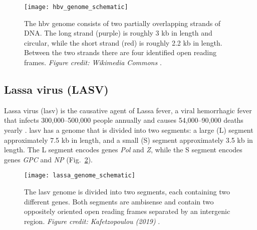 \begin{figure}[ht]
  \centering
  \medskip
  \texttt{[image: hbv\_genome\_schematic]}
  \caption[Schematic of the HBV genome]{The \gls{hbv} genome consists of two partially overlapping strands of DNA. The long strand (purple) is roughly 3 kb in length and circular, while the short strand (red) is roughly 2.2 kb in length. Between the two strands there are four identified open reading frames. \textit{Figure credit: Wikimedia Commons} \cite{HBVwiki}.}
  \label{fig:hbvGenome}
\end{figure}

\subsection{Lassa virus (LASV)}

Lassa virus (\gls{lasv}) is the causative agent of Lassa fever, a viral hemorrhagic fever that infects 300,000--500,000 people annually and causes 54,000--90,000 deaths yearly \cite{lianaThesis, asogun2012molecular}.
\gls{lasv} has a genome that is divided into two segments: a large (L) segment approximately 7.5 kb in length, and a small (S) segment approximately 3.5 kb in length.
The L segment encodes genes \textit{Pol} and \textit{Z}, while the S segment encodes genes \textit{GPC} and \textit{NP} (Fig.~\ref{fig:lasvGenome}).

\begin{figure}[ht]
  \centering
  \medskip
  \texttt{[image: lassa\_genome\_schematic]}
  \caption[Schematic of the LASV genome]{The \gls{lasv} genome is divided into two segments, each containing two different genes. Both segments are ambisense and contain two oppositely oriented open reading frames separated by an intergenic region. \textit{Figure credit: Kafetzopoulou (2019)} \cite{lianaThesis}.}
  \label{fig:lasvGenome}
\end{figure}

\cleardoublepage

